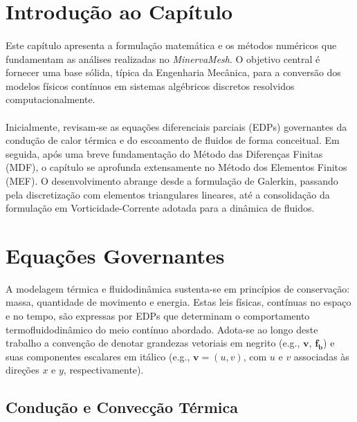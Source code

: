\section{Introdução ao Capítulo}
\label{sec:fundamentacao_intro}

\paragraph{}Este capítulo apresenta a formulação matemática e os métodos numéricos que fundamentam as análises realizadas no \textit{MinervaMesh}. O objetivo central é fornecer uma base sólida, típica da Engenharia Mecânica, para a conversão dos modelos físicos contínuos em sistemas algébricos discretos resolvidos computacionalmente.

\paragraph{}Inicialmente, revisam-se as equações diferenciais parciais (EDPs) governantes da condução de calor térmica e do escoamento de fluidos de forma conceitual. Em seguida, após uma breve fundamentação do Método das Diferenças Finitas (MDF), o capítulo se aprofunda extensamente no Método dos Elementos Finitos (MEF). O desenvolvimento abrange desde a formulação de Galerkin, passando pela discretização com elementos triangulares lineares, até a consolidação da formulação em Vorticidade-Corrente adotada para a dinâmica de fluidos.

\section{Equações Governantes}
\label{sec:equacoes_governantes}

A modelagem térmica e fluidodinâmica sustenta-se em princípios de conservação: massa, quantidade de movimento e energia. Estas leis físicas, contínuas no espaço e no tempo, são expressas por EDPs que determinam o comportamento termofluidodinâmico do meio contínuo abordado. Adota-se ao longo deste trabalho a convenção de denotar grandezas vetoriais em negrito (e.g., $\mathbf{v}$, $\mathbf{f_b}$) e suas componentes escalares em itálico (e.g., $\mathbf{v} = (u, v)$, com $u$ e $v$ associadas às direções $x$ e $y$, respectivamente).

\subsection{Condução e Convecção Térmica}

